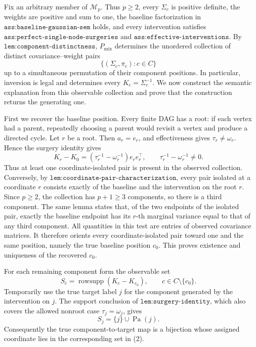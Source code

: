 Fix an arbitrary member of \(\mathcal M_p\).  Thus \(p\geq 2\), every
\(\Sigma_c\) is positive definite, the weights are positive and sum to one,
the baseline factorization in \(\texttt{ass:baseline-gaussian-sem}\) holds,
and every intervention satisfies
\(\texttt{ass:perfect-single-node-surgeries}\) and
\(\texttt{ass:effective-interventions}\).  By
\(\texttt{lem:component-distinctness}\), \(P_{\mathrm{mix}}\) determines the
unordered collection of distinct covariance--weight pairs
\[
 \bigl\{(\Sigma_c,\pi_c):c\in C\bigr\}
\]
up to a simultaneous permutation of their component positions.  In
particular, inversion is legal and determines every
\(K_c=\Sigma_c^{-1}\).  We now construct the semantic explanation from this
observable collection and prove that the construction returns the generating
one.

First we recover the baseline position.  Every finite DAG has a root: if each
vertex had a parent, repeatedly choosing a parent would revisit a vertex and
produce a directed cycle.  Let \(r\) be a root.  Then
\(a_r=e_r\), and effectiveness gives \(\tau_r\neq\omega_r\).  Hence the
surgery identity gives
\[
 K_r-K_0
 =\left(\tau_r^{-1}-\omega_r^{-1}\right)e_re_r^{\top},
 \qquad \tau_r^{-1}-\omega_r^{-1}\neq0.                 \tag{1}
\]
Thus at least one coordinate-isolated pair is present in the observed
collection.  Conversely, by
\(\texttt{lem:coordinate-pair-characterization}\), every pair isolated at a
coordinate \(r\) consists exactly of the baseline and the intervention on the
root \(r\).  Since \(p\geq2\), the collection has \(p+1\geq3\) components, so
there is a third component.  The same lemma states that, of the two endpoints
of the isolated pair, exactly the baseline endpoint has its \(r\)-th marginal
variance equal to that of any third component.  All quantities in this test
are entries of observed covariance matrices.  It therefore orients every
coordinate-isolated pair toward one and the same position, namely the true
baseline position \(c_0\).  This proves existence and uniqueness of the
recovered \(c_0\).

For each remaining component form the observable set
\[
 S_c=\operatorname{rowsupp}(K_c-K_{c_0}),
 \qquad c\in C\setminus\{c_0\}.                         \tag{2}
\]
Temporarily use the true target label \(j\) for the component generated by
the intervention on \(j\).  The support conclusion of
\(\texttt{lem:surgery-identity}\), which also covers the allowed nonroot case
\(\tau_j=\omega_j\), gives
\[
 S_j=\{j\}\cup\operatorname{Pa}(j).                    \tag{3}
\]
Consequently the true component-to-target map is a bijection whose assigned
coordinate lies in the corresponding set in (2).

